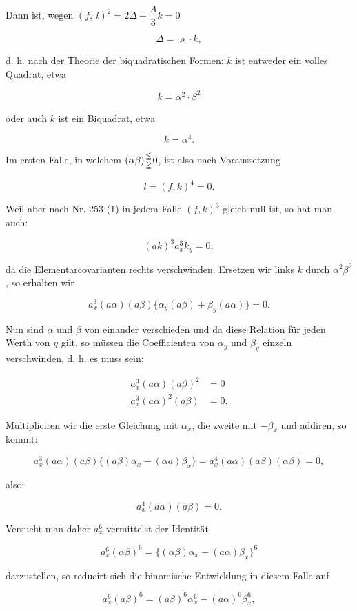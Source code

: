 \documentclass[11pt]{article}
\providecommand{\weberpage}[1]{}
\begin{document}
Dann ist, wegen $(f,\ l)^2 = 2\varDelta + \dfrac{A}{3} k = 0$

\[ \varDelta = \varrho \cdot k, \]

d. h. nach der Theorie der biquadratischen Formen: $k$ ist entweder ein volles Quadrat, etwa

\[ k = \alpha^2 \cdot \beta^2 \]


\weberpage{317}

oder auch $k$ ist ein Biquadrat, etwa

\[
k = \alpha^4.
\]

Im ersten Falle, in welchem $(\alpha\beta)\genfrac{}{}{0pt}{}{\leqq}{\geqq}0$, ist also nach Voraussetzung

\[
l = (f, k)^4 = 0.
\]

Weil aber nach Nr. 253 (1) in jedem Falle $(f, k)^3$ gleich null ist, so hat man auch:

\[
(ak)^3 a_x^3 k_y = 0,
\]

da die Elementarcovarianten rechts verschwinden. Ersetzen wir links $k$ durch $\alpha^2\beta^2$, so erhalten wir

\[
a_x^3 (a\alpha)(a\beta)\{\alpha_y(a\beta) + \beta_y(a\alpha)\} = 0.
\]

Nun sind $\alpha$ und $\beta$ von einander verschieden und da diese Relation für jeden Werth von $y$ gilt, so müssen die Coefficienten von $\alpha_y$ und $\beta_y$ einzeln verschwinden, d. h. es muss sein:

\[
\begin{aligned}
a_x^3(a\alpha)(a\beta)^2 &= 0\\
a_x^3(a\alpha)^2(a\beta) &= 0.
\end{aligned}
\]

Multipliciren wir die erste Gleichung mit $\alpha_x$, die zweite mit $-\beta_x$ und addiren, so kommt:

\[
a_x^3(a\alpha)(a\beta)\{(a\beta)\alpha_x - (\alpha a)\beta_x\} = a_x^4(a\alpha)(a\beta)(\alpha\beta) = 0,
\]

also:

\[
a_x^4(a\alpha)(a\beta) = 0.
\]

Versucht man daher $a_x^6$ vermittelst der Identität

\[
a_x^6(\alpha\beta)^6 = \{(\alpha\beta)\alpha_x - (a\alpha)\beta_x\}^6
\]

darzustellen, so reducirt sich die binomische Entwicklung in diesem Falle auf

\[
a_x^6(a\beta)^6 = (a\beta)^6\alpha_x^6 - (a\alpha)^6\beta_x^6,
\]
\end{document}
